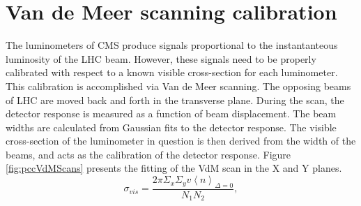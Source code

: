 \section{Van de Meer scanning calibration}

The luminometers of CMS produce signals proportional to the instantanteous luminosity of the LHC beam. However, these signals need to be properly calibrated with respect to a known visible cross-section for each luminometer. This calibration is accomplished via Van de Meer scanning. The opposing beams of LHC are moved back and forth in the transverse plane. During the scan, the detector response is measured as a function of beam displacement. The beam widths are calculated from Gaussian fits to the detector response. The visible cross-section of the luminometer in question is then derived from the width of the beams, and acts as the calibration of the detector response. Figure \ref{fig:pccVdMScans} presents the fitting of the VdM scan in the X and Y planes. 
\begin{equation}
\sigma_{vis} = \frac{2 \pi \Sigma_x \Sigma_y v\left \langle n \right \rangle_{\Delta=0}}{N_1 N_2},
\end{equation}

